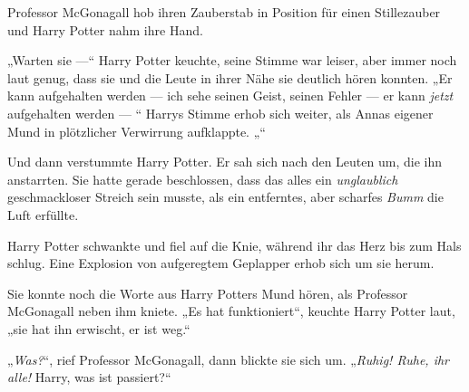 Professor McGonagall hob ihren Zauberstab in Position für einen Stillezauber und Harry Potter nahm ihre Hand.

„Warten sie —“
Harry Potter keuchte, seine Stimme war leiser, aber immer noch laut genug, dass sie und die Leute in ihrer Nähe sie deutlich hören konnten.
„Er kann aufgehalten werden — ich sehe seinen Geist, seinen Fehler — er kann \emph{jetzt} aufgehalten werden — “
Harrys Stimme erhob sich weiter, als Annas eigener Mund in plötzlicher Verwirrung aufklappte.
„“

Und dann verstummte Harry Potter.
Er sah sich nach den Leuten um, die ihn anstarrten. Sie hatte gerade beschlossen, dass das alles ein \emph{unglaublich} geschmackloser Streich sein musste, als ein entferntes, aber scharfes \emph{Bumm} die Luft erfüllte.

Harry Potter schwankte und fiel auf die Knie, während ihr das Herz bis zum Hals schlug. Eine Explosion von aufgeregtem Geplapper erhob sich um sie herum.

Sie konnte noch die Worte aus Harry Potters Mund hören, als Professor McGonagall neben ihm kniete.
„Es hat funktioniert“, keuchte Harry Potter laut, „sie hat ihn erwischt, er ist weg.“

„\emph{Was?}“, rief Professor McGonagall, dann blickte sie sich um.
„\emph{Ruhig! Ruhe, ihr alle!} Harry, was ist passiert?“

